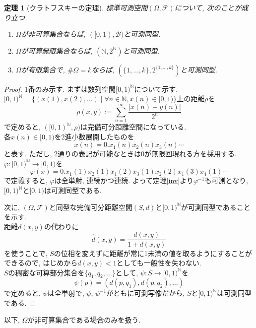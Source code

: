 \documentclass[a4paper,12pt]{jsarticle}
\theoremstyle{break}
\newtheorem{theorem}{定理}
\begin{document}
\begin{theorem}[クラトフスキーの定理]\label{kuratowski}
標準可測空間$(\Omega,\mathcal{F})$について, 次のことが成り立つ.
\begin{enumerate}
  \item $\Omega$が非可算集合ならば, $([0,1),\mathcal{B})$と可測同型.
  \item $\Omega$が可算無限集合ならば, $(\mathbb{N},2^{\mathbb{N}})$と可測同型.
  \item $\Omega$が有限集合で, $\#\Omega=k$ならば, $(\{1,\dots,k\},2^{\{1,\dots,k\}})$と可測同型.
\end{enumerate}
\end{theorem}

\begin{proof}
1番のみ示す. まずは数列空間$[0,1)^\mathbb{N}$について示す.\\
$[0,1)^\mathbb{N}=\{(x(1),x(2),\dots)\mid\forall n\in\mathbb{N}, x(n)\in [0,1)\}$上の距離$\rho$を
\begin{equation*}
\rho(x,y):=\sum_{n=1}^{\infty}\frac{|x(n)-y(n)|}{2^n}
\end{equation*}
で定めると, $([0,1)^{\mathbb{N}},\rho)$は完備可分距離空間になっている. \\
各$x(n)\in[0,1)$を2進小数展開したものを
\begin{equation*}
x(n)=0.x_1(n)x_2(n)x_3(n)\cdots
\end{equation*}
と表す. ただし, 2通りの表記が可能なときは0が無限回現れる方を採用する.\\
$\varphi:[0,1)^{\mathbb{N}}\to[0,1)$を
\begin{equation*}
\varphi(x)=0.x_1(1)x_2(1)x_1(2)x_3(1)x_2(2)x_1(3)x_4(1)\cdots
\end{equation*}
で定義すると, $\varphi$は全単射, 連続かつ連続. よって定理\ref{inv}より$\varphi^{-1}$も可測となり, $[0,1)^{\mathbb{N}}$と$[0,1)$は可測同型である.
\par
次に, $(\Omega,\mathcal{F})$と同型な完備可分距離空間$(S,d)$と$[0,1)^\mathbb{N}$が可測同型であることを示す.\\
距離$d(x,y)$の代わりに
\begin{equation*}
\hat{d}(x,y)=\frac{d(x,y)}{1+d(x,y)}
\end{equation*}
を使うことで, $S$の位相を変えずに距離が常に1未満の値を取るようにすることができるので, はじめから$d(x,y)<1$としても一般性を失わない.\\
$S$の稠密な可算部分集合を$\{q_1,q_2,\dots\}$として, $\psi:S\to[0,1)^\mathbb{N}$を
\begin{equation*}
\psi(p)=(d(p,q_1),d(p,q_2),\dots)
\end{equation*}
で定めると, $\psi$は全単射で, $\psi$, $\psi^{-1}$がともに可測写像だから, $S$と$[0,1)^\mathbb{N}$は可測同型である.
\end{proof}
以下, $\Omega$が非可算集合である場合のみを扱う.
\end{document}
